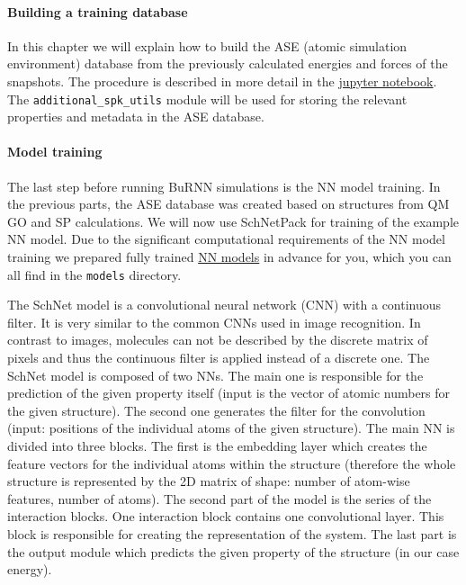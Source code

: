 \paragraph{Building a training database}
In this chapter we will explain how to build the ASE (atomic simulation environment) \cite{Larsen2017ASE} database from the previously calculated energies and forces of the snapshots. The procedure is described in more detail in the \href{https://github.com/LierB/gromos_tutorial_livecoms/blob/burnn_tutorial_rc/tutorial_files/t_06/train_dataset_tutorial/tutorial_v2.ipynb}{jupyter notebook}. The \texttt{additional\_spk\_utils} module will be used for storing the relevant properties and metadata in the ASE database. 


\paragraph{Model training}
The last step before running BuRNN simulations is the NN model training. In the previous parts, the ASE database was created based on structures from QM GO and SP calculations. We will now use SchNetPack for training of the example NN model. Due to the significant computational requirements of the NN model training we prepared fully trained \href{https://github.com/LierB/gromos_tutorial_livecoms/tree/burnn_tutorial_rc/tutorial_files/t_06/models}{NN models} in advance for you, which you can all find in the \texttt{models} directory. 

The SchNet model \cite{Schuett2018SchNet} is a convolutional neural network (CNN) with a continuous filter. It is very similar to the common CNNs used in image recognition. In contrast to images, molecules can not be described by the discrete matrix of pixels and thus the continuous filter is applied instead of a discrete one. The SchNet model is composed of two NNs. The main one is responsible for the prediction of the given property itself (input is the vector of atomic numbers for the given structure). The second one generates the filter for the convolution (input: positions of the individual atoms of the given structure). The main NN is divided into three blocks. The first is the embedding layer which creates the feature vectors for the individual atoms within the structure (therefore the whole structure is represented by the 2D matrix of shape: number of atom-wise features, number of atoms). The second part of the model is the series of the interaction blocks. One interaction block contains one convolutional layer. This block is responsible for creating the representation of the system. The last part is the output module which predicts the given property of the structure (in our case energy).

